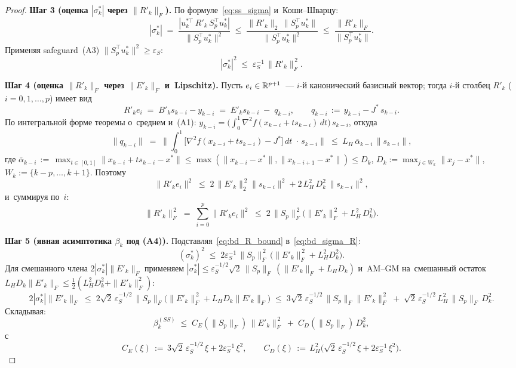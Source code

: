 \begin{proof}
\medskip
\textbf{Шаг 3 (оценка $|\sigma_k^{*}|$ через $\|R'_k\|_F$).}
По формуле~\eqref{eq:ss_sigma} и~Коши--Шварцу:
\[
  |\sigma_k^{*}|
  \;=\; \frac{|u_k^{*\top}\,R'_k\,S_p^{\top}u_k^{*}|}{\|S_p^{\top}u_k^{*}\|^2}
  \;\le\; \frac{\|R'_k\|_2\,\|S_p^{\top}u_k^{*}\|}{\|S_p^{\top}u_k^{*}\|^2}
  \;\le\; \frac{\|R'_k\|_F}{\|S_p^{\top}u_k^{*}\|}.
\]
Применяя safeguard~(A3) $\|S_p^{\top}u_k^{*}\|^2\ge\varepsilon_S$:
\begin{equation}\label{eq:bd_sigma_R}
  |\sigma_k^{*}|^2 \;\le\; \varepsilon_S^{-1}\,\|R'_k\|_F^{\,2}.
\end{equation}

\medskip
\textbf{Шаг 4 (оценка $\|R'_k\|_F$ через $\|E'_k\|_F$ и~Lipschitz).}
Пусть $e_i\in\mathbb{R}^{p+1}$~--- $i$-й канонический базисный вектор;
тогда $i$-й столбец $R'_k$ ($i=0,1,\dots,p$) имеет вид
\[
  R'_k e_i \;=\; B'_k s_{k-i} - y_{k-i}
          \;=\; E'_k s_{k-i} \;-\; q_{k-i},
  \qquad q_{k-i}\,:=\,y_{k-i} - J^{*}\,s_{k-i}.
\]
По интегральной форме теоремы о~среднем и~(A1):
$y_{k-i} = \bigl(\int_0^1 \nabla^2 f(x_{k-i}+t s_{k-i})\,dt\bigr)\, s_{k-i}$,
откуда
\[
  \|q_{k-i}\|
   \;=\; \biggl\|\int_0^1 \bigl[\nabla^2 f(x_{k-i}+t s_{k-i}) - J^{*}\bigr]\,dt\;\cdot\,s_{k-i}\biggr\|
   \;\le\; L_H\,\bar\alpha_{k-i}\,\|s_{k-i}\|,
\]
где $\bar\alpha_{k-i}\,:=\,\max_{t\in[0,1]}\|x_{k-i}+t s_{k-i}-x^{*}\|
\le\max(\|x_{k-i}-x^{*}\|,\|x_{k-i+1}-x^{*}\|)\le D_k$,
$D_k:=\max_{j\in W_k}\|x_j-x^*\|$, $W_k:=\{k-p,\dots,k+1\}$.
Поэтому
\[
  \|R'_k e_i\|^2
  \;\le\; 2\,\|E'_k\|_2^{\,2}\|s_{k-i}\|^2
       + 2\,L_H^2\, D_k^2\,\|s_{k-i}\|^2,
\]
и~суммируя по~$i$:
\begin{equation}\label{eq:bd_R_bound}
  \|R'_k\|_F^{\,2}
  \;=\; \sum_{i=0}^p \|R'_k e_i\|^2
  \;\le\; 2\,\|S_p\|_F^{\,2}\bigl(\|E'_k\|_F^{\,2} + L_H^2\,D_k^2\bigr).
\end{equation}

\medskip
\textbf{Шаг 5 (явная асимптотика $\beta_k$ под (A4)).}
Подставляя~\eqref{eq:bd_R_bound} в~\eqref{eq:bd_sigma_R}:
\[
  (\sigma_k^{*})^2 \;\le\; 2\varepsilon_S^{-1}\,\|S_p\|_F^{\,2}\,
                          \bigl(\|E'_k\|_F^{\,2} + L_H^2 D_k^2\bigr).
\]
Для смешанного члена $2|\sigma_k^{*}|\|E'_k\|_F$ применяем
$|\sigma_k^{*}|\le\varepsilon_S^{-1/2}\sqrt{2}\,\|S_p\|_F\,(\|E'_k\|_F+L_H D_k)$
и~AM--GM на~смешанный остаток $L_H D_k\|E'_k\|_F\le\tfrac12(L_H^2 D_k^2 + \|E'_k\|_F^2)$:
\[
  2|\sigma_k^{*}|\|E'_k\|_F
  \;\le\; 2\sqrt{2}\,\varepsilon_S^{-1/2}\,\|S_p\|_F\bigl(\|E'_k\|_F^{\,2}
                                                   + L_H D_k\|E'_k\|_F\bigr)
  \;\le\; 3\sqrt{2}\,\varepsilon_S^{-1/2}\,\|S_p\|_F\|E'_k\|_F^{\,2}
       \;+\; \sqrt{2}\,\varepsilon_S^{-1/2}\,L_H^2\,\|S_p\|_F\,D_k^2.
\]
Складывая:
\begin{equation}\label{eq:bd_beta_decomp}
  \beta_k^{(SS)}
  \;\le\; C_E(\|S_p\|_F)\,\|E'_k\|_F^{\,2}
       \;+\; C_D(\|S_p\|_F)\,D_k^2,
\end{equation}
с~
\[
  C_E(\xi)\,:=\,3\sqrt{2}\,\varepsilon_S^{-1/2}\,\xi + 2\varepsilon_S^{-1}\,\xi^2,
  \qquad
  C_D(\xi)\,:=\,L_H^2\bigl(\sqrt{2}\,\varepsilon_S^{-1/2}\,\xi + 2\varepsilon_S^{-1}\,\xi^2\bigr).
\]


\end{proof}
